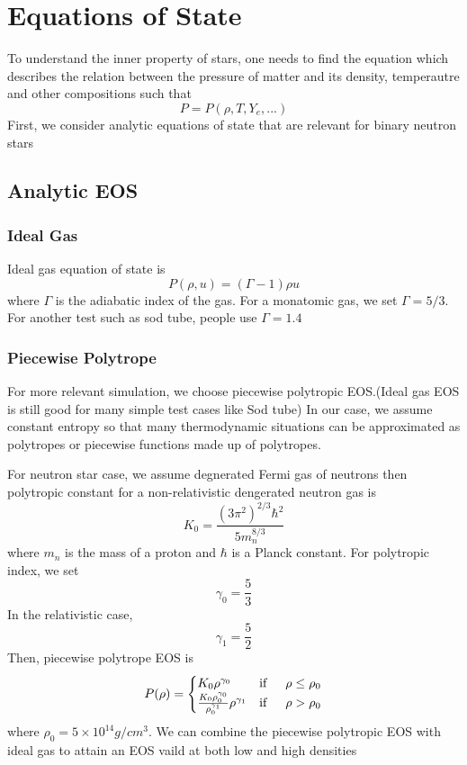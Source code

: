 \documentclass{article}
\begin{document}
\section{Equations of State}
To understand the inner property of stars, one needs to find the equation which describes the relation between the pressure of matter and its density, temperautre and other compositions such that
\begin{equation}
P = P(\rho, T, Y_e, ...)
\end{equation}
First, we consider analytic equations of state that are relevant for binary neutron stars
\subsection{Analytic EOS}
\subsubsection{Ideal Gas}
Ideal gas equation of state is
\begin{equation}
P(\rho,u) = (\Gamma - 1) \rho u
\end{equation}
where $\Gamma$ is the adiabatic index of the gas. For a monatomic gas, we set $\Gamma = 5/3$. For another test such as sod tube, people use $\Gamma = 1.4$ 
\subsubsection{Piecewise Polytrope}
For more relevant simulation, we choose piecewise polytropic EOS.(Ideal gas EOS is still good for many simple test cases like Sod tube) In our case, we assume constant entropy so that many thermodynamic situations can be approximated as polytropes or piecewise functions made up of polytropes.

For neutron star case, we assume degnerated Fermi gas of neutrons then polytropic constant for a non-relativistic dengerated neutron gas is
\begin{equation}
K_0 = \frac{(3 \pi^2)^{2/3} \hbar^2}{5 m_n^{8/3}}
\end{equation}
where $m_n$ is the mass of a proton and $\hbar$ is a Planck constant. For polytropic index, we set
\begin{equation}
\gamma_0 = \frac{5}{3}
\end{equation}
In the relativistic case,
\begin{equation}
\gamma_1 = \frac{5}{2}
\end{equation}
Then, piecewise polytrope EOS is
\begin{equation}
P(\rho) = \begin{cases}
K_0 \rho^{\gamma_0} & \text{if} \indent \rho \leq \rho_0 \\
\frac{K_0 \rho_0^{\gamma_0}}{\rho_0^{\gamma_1}} \rho^{\gamma_1} & \text{if} \indent \rho > \rho_0 
\end{cases}
\end{equation}
where $\rho_0 = 5 \times 10^{14} g/cm^3$. We can combine the piecewise polytropic EOS with ideal gas to attain an EOS vaild at both low and high densities 
\end{document}

